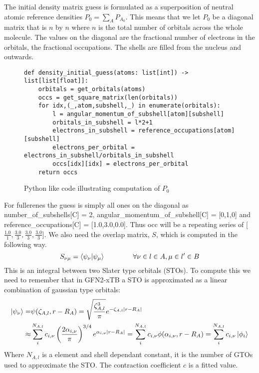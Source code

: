 The initial density matrix guess is formulated as a superposition of neutral atomic reference densities $P_0 = \sum_{A}P_{A_0}$. This means that we let $P_0$ be a diagonal matrix that is $n$ by $n$ where $n$ is the total number of orbitals across the whole molecule. The values on the diagonal are the fractional number of electrons in the orbitals, the fractional occupations. The shells are filled from the nucleus and outwards. 
\begin{figure}[H]
\begin{verbatim}
def density_initial_guess(atoms: list[int]) -> list[list[float]]:
    orbitals = get_orbitals(atoms)
    occs = get_square_matrix(len(orbitals))
    for idx,(_,atom,subshell,_) in enumerate(orbitals):
        l = angular_momentum_of_subshell[atom][subshell] 
        orbitals_in_subshell = l*2+1 
        electrons_in_subshell = reference_occupations[atom][subshell]
        electrons_per_orbital = electrons_in_subshell/orbitals_in_subshell
        occs[idx][idx] = electrons_per_orbital
    return occs
\end{verbatim}
\caption{Python like code illustrating computation of $P_0$}
\end{figure}
For fullerenes the guess is simply all ones on the diagonal as number\_of\_subshells[C] = 2, angular\_momentum\_of\_subshell[C] = [0,1,0] and reference\_occupations[C] = [1.0,3.0,0.0]. Thus occ will be a repeating series of [$\frac{1.0}{1},\frac{3.0}{3},\frac{3.0}{3},\frac{3.0}{3}$].
We also need the overlap matrix, $S$, which is computed in the following way.
\begin{equation}
S_{\nu\mu} = \braket{\psi_\nu|\psi_\mu}\quad\quad\quad\quad\forall \nu \in l \in A,\mu \in l' \in B
\end{equation}
This is an integral between two Slater type orbitals (STOs). To compute this we need to remember that in GFN2-xTB a STO is approximated as a linear combination of gaussian type orbitals:
\begin{equation}
    \begin{split}
        \ket{\psi_\nu} =&\psi(\zeta_{A,l},r-R_A) = \sqrt{\frac{\zeta_{A,l}^3}{\pi}}e^{-\zeta_{A,l}|r-R_A|}\\
        \approx &\sum_i^{N_{A,l}}c_{i,\nu}\left(\frac{2\alpha_{i,\nu}}{\pi}\right)^{3/4}e^{\alpha_{i,\nu}|r-R_A|}=\sum_i^{N_{A,l}}c_{i,\nu}\phi(\alpha_{i,\nu},r-R_A) = \sum_i^{N_{A,l}}c_{i,\nu}\ket{\phi_i}
    \end{split}
\end{equation}
Where $N_{A,l}$ is a element and shell dependant constant, it is the number of GTOs used to approximate the STO. The contraction coefficient $c$ is a fitted value. 

